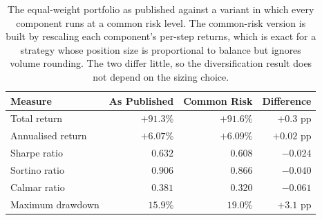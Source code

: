 \begin{table}[htb!]
\centering
\footnotesize
\begin{tabular}{@{}lrrr@{}}
\toprule
\textbf{Measure} & \textbf{As Published} & \textbf{Common Risk} & \textbf{Difference} \\
\midrule
Total return & $+91.3\%$ & $+91.6\%$ & $+0.3$ pp \\
Annualised return & $+6.07\%$ & $+6.09\%$ & $+0.02$ pp \\
Sharpe ratio & $0.632$ & $0.608$ & $-0.024$ \\
Sortino ratio & $0.906$ & $0.866$ & $-0.040$ \\
Calmar ratio & $0.381$ & $0.320$ & $-0.061$ \\
Maximum drawdown & $15.9\%$ & $19.0\%$ & $+3.1$ pp \\
\bottomrule
\end{tabular}
\caption{The equal-weight portfolio as published against a variant in which every component runs at a common risk level. The common-risk version is built by rescaling each component's per-step returns, which is exact for a strategy whose position size is proportional to balance but ignores volume rounding. The two differ little, so the diversification result does not depend on the sizing choice.}
\label{Tables:CommonRisk}
\end{table}